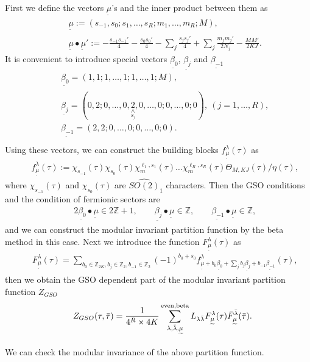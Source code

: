 \documentclass[a4paper,12pt]{article}
\numberwithin{equation}{section}
\newcommand{\Th}{\Theta}
\newcommand{\Zb}{{\mathbb Z}}
\newcommand{\mt}{\underset{\widetilde{}}{\mu}}
\newcommand{\bt}[1]{\underset{\widetilde{}}{\beta_{#1}}}
\newcommand{\taub}{\bar{\tau}}
\newcommand{\lambdab}{\bar{\lambda}}
\begin{document}
First we define the vectors $\mt$'s and the inner product
between them as
\begin{eqnarray*}
 && \mt:=(s_{-1},s_0;s_1,\dots,s_R;m_1,\dots,m_R;M),\\
 && \mt\bullet\mt':=-\frac{s_{-1}s_{-1}'}{4}-\frac{s_{0}s_{0}'}{4}
-\sum_{j}\frac{s_{j}s_{j}'}{4}+\sum_{j}\frac{m_jm_j'}{2N_j}
-\frac{MM'}{2KJ}.
\end{eqnarray*}
It is convenient to introduce  special vectors $\bt{0}$, $\bt{j}$ and
$\bt{-1}$
\begin{eqnarray*}
 && \bt{0}=(1,1;1,\dots,1;1,\dots,1;M),\\
 && \bt{j}=(0,2;0,\dots,0,\underset{\underset{S_j}{\wedge}}{2}
,0,\dots,0;0,\dots,0;0),\ (j=1,\dots,R),\\
 && \bt{-1}=(2,2;0,\dots,0;0,\dots,0;0).\\
\end{eqnarray*}
Using these vectors, we can construct the building blocks
 $f^{\lambda}_{\mt}(\tau)$ as
\begin{eqnarray*}
 &&f^{\lambda}_{\mt}(\tau):=
\chi_{s_{-1}}(\tau)\chi_{s_{0}}(\tau)\chi_{m}^{\ell_1,s_1}(\tau)
\dots \chi_{m}^{\ell_R,s_R}(\tau)
\Th_{M,KJ}(\tau)/\eta(\tau),
\end{eqnarray*}
where $\chi_{s_{-1}}(\tau)$ and $\chi_{s_{0}}(\tau)$ 
are $\widehat{SO(2)}_1$
characters. Then the GSO conditions and the condition
of fermionic sectors are
\begin{eqnarray}
 && 2\bt{0}\bullet \mt\in 2 \Zb+1,\qquad
 \bt{j}\bullet \mt \in \Zb,\qquad
 \bt{-1}\bullet \mt  \in \Zb, \label{BetaCondition4}
\end{eqnarray}
and we can construct the modular invariant partition function
by the beta method in this case.
Next we introduce the function $F_{\mt}^{\lambda}(\tau)$ as
\begin{eqnarray*}
 && F_{\mt}^{\lambda}(\tau)=\sum_{b_0\in\Zb_{2K},b_j\in\Zb_2,b_{-1}\in\Zb_2}
(-1)^{b_0+s_0}
f_{\mt+b_0\bt{0}+\sum_j b_j\bt{j}+b_{-1}\bt{-1}}^{\lambda}(\tau),
\end{eqnarray*}
then we obtain
the GSO dependent part of the modular invariant partition function 
$Z_{GSO}$
\begin{eqnarray*}
 &&Z_{GSO}(\tau,\taub) = 
\frac{1}{4^R\times 4K}\sum_{\lambda,\lambdab,\mt}^{\rm even,beta}
L_{\lambda\lambdab}F_{\mt}^{\lambda}(\tau)\bar F_{\mt}^{\lambdab}(\taub).\\
\end{eqnarray*}
We can check the modular invariance of the above partition function.
\end{document}
